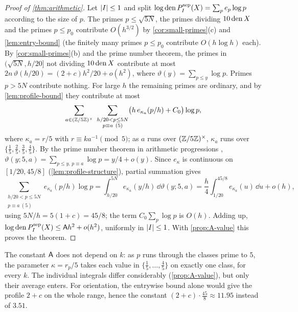 \begin{proof}[Proof of \cref{thm:arithmetic}]
Let $\lvert I\rvert\le1$ and split $\log\operatorname{den} P^{\mathrm{sep}}_I(X)=\sum_pe_p\log p$ according to the size of $p$.
The primes $p\le\sqrt{5N}$, the primes dividing $10\operatorname{den} X$ and the primes $p\le p_0$ contribute
$O(h^{3/2})$ by \cref{cor:small-primes}(c) and \cref{lem:entry-bound} (the finitely many primes
$p\le p_0$ contribute $O(h\log h)$ each). By \cref{cor:small-primes}(b) and the prime number
theorem, the primes in $(\sqrt{5N},h/20]$ not dividing $10\operatorname{den} X$
contribute at most $2n\,\vartheta(h/20)=(2+c)h^2/20+o(h^2)$, where $\vartheta(y)=\sum_{p\le y}\log p$.
Primes $p>5N$ contribute nothing. For large $h$ the remaining primes are ordinary, and by
\cref{lem:profile-bound} they contribute at most
\[
  \sum_{a\in(\Z/5\Z)^\times}\ \sum_{\substack{h/20<p\le5N\\p\equiv a\ (5)}}
  \bigl(h\,e_{\kappa_a}(p/h)+C_0\bigr)\log p ,
\]
where $\kappa_a=r/5$ with $r\equiv ka^{-1}\pmod5$; as $a$ runs over $(\mathbb{Z}/5\mathbb{Z})^\times$, $\kappa_a$
runs over $\{\frac15,\frac25,\frac35,\frac45\}$. By the prime number theorem in arithmetic
progressions \cite[Chapter~11]{MontgomeryVaughan2007},
$\vartheta(y;5,a)=\sum_{p\le y,\,p\equiv a}\log p=y/4+o(y)$. Since $e_\kappa$ is continuous on
$[1/20,45/8]$ (\cref{lem:profile-structure}), partial summation gives
\[
  \sum_{\substack{h/20<p\le5N\\p\equiv a\ (5)}}e_{\kappa_a}(p/h)\log p
  =\int_{h/20}^{5N}e_{\kappa_a}(y/h)\,\dd\vartheta(y;5,a)
  =\frac h4\int_{1/20}^{45/8}e_{\kappa_a}(u)\,\dd u+o(h),
\]
using $5N/h=5(1+c)=45/8$; the term $C_0\sum_p\log p$ is $O(h)$. Adding up,
$\log\operatorname{den} P^{\mathrm{sep}}_I(X)\le\mathsf{A} h^2+o(h^2)$, uniformly in $\lvert I\rvert\le1$. With
\cref{prop:A-value} this proves the theorem.
\end{proof}

\begin{remark}\label{rem:A-k-independent}
The constant $\mathsf{A}$ does not depend on $k$: as $p$ runs through the classes prime to $5$, the
parameter $\kappa=r_p/5$ takes each value in $\{\frac15,\dots,\frac45\}$ on exactly one class, for
every $k$. The individual integrals differ considerably (\cref{prop:A-value}), but only their
average enters. For orientation, the entrywise bound alone would give the profile $2+c$ on the
whole range, hence the constant $(2+c)\cdot\frac{45}{8}\approx11.95$ instead of $3.51$.
\end{remark}
